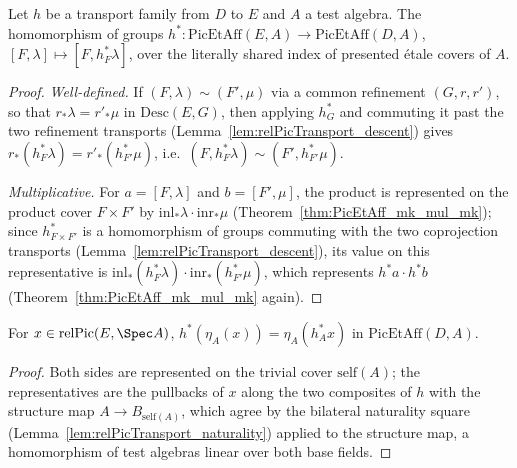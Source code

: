 \begin{definition}
  \label{def:PicEtAffTransport}
  \leanok
  Let \(h\) be a transport family from \(D\) to \(E\) and \(A\) a test algebra. The
  homomorphism of groups
  \(h^{*} \colon \mathrm{PicEtAff}(E, A) \to \mathrm{PicEtAff}(D, A)\),
  \([F, \lambda] \mapsto [F, h_F^{*}\lambda]\), over the literally shared index of
  presented \'etale covers of \(A\).
\end{definition}
\begin{proof}
  \leanok
  \emph{Well-defined.} If \((F, \lambda) \sim (F', \mu)\) via a common refinement
  \((G, r, r')\), so that \(r_{*}\lambda = r'_{*}\mu\) in \(\mathrm{Desc}(E, G)\), then
  applying \(h_G^{*}\) and commuting it past the two refinement transports
  (Lemma~\ref{lem:relPicTransport_descent}) gives
  \(r_{*}(h_F^{*}\lambda) = r'_{*}(h_{F'}^{*}\mu)\), i.e.\
  \((F, h_F^{*}\lambda) \sim (F', h_{F'}^{*}\mu)\).

  \emph{Multiplicative.} For \(a = [F, \lambda]\) and \(b = [F', \mu]\), the product is
  represented on the product cover \(F \times F'\) by
  \(\mathrm{inl}_{*}\lambda \cdot \mathrm{inr}_{*}\mu\)
  (Theorem~\ref{thm:PicEtAff_mk_mul_mk}); since \(h_{F \times F'}^{*}\) is a homomorphism
  of groups commuting with the two coprojection transports
  (Lemma~\ref{lem:relPicTransport_descent}), its value on this representative is
  \(\mathrm{inl}_{*}(h_F^{*}\lambda) \cdot \mathrm{inr}_{*}(h_{F'}^{*}\mu)\), which
  represents \(h^{*}a \cdot h^{*}b\) (Theorem~\ref{thm:PicEtAff_mk_mul_mk} again).
\end{proof}

\begin{theorem}
  \label{thm:PicEtAffTransport_unit}
  \provenancetag{CUSTOM}
  \leanok
  For \(x \in \mathrm{relPic}(E, \Spec A)\),
  \(h^{*}(\eta_A(x)) = \eta_A(h_A^{*} x)\) in \(\mathrm{PicEtAff}(D, A)\).
\end{theorem}
\begin{proof}
  \leanok
  Both sides are represented on the trivial cover \(\mathrm{self}(A)\); the representatives
  are the pullbacks of \(x\) along the two composites of \(h\) with the structure map
  \(A \to B_{\mathrm{self}(A)}\), which agree by the bilateral naturality square
  (Lemma~\ref{lem:relPicTransport_naturality}) applied to the structure map, a
  homomorphism of test algebras linear over both base fields.
\end{proof}

